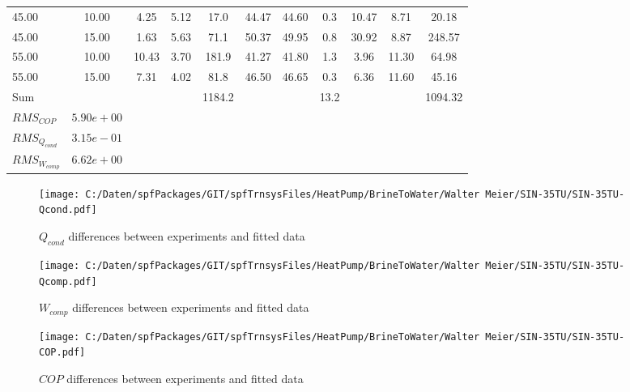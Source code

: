 \documentclass[english]{SPFShortReport}
\begin{document}
\begin{table}[!ht]
\begin{small}
\begin{center}
{\begin{tabular}{l | c c c c c c c c c c }
45.00  & 10.00 & 4.25 & 5.12 & 17.0 & 44.47 & 44.60 & 0.3 & 10.47 & 8.71 & 20.18\\ 
45.00  & 15.00 & 1.63 & 5.63 & 71.1 & 50.37 & 49.95 & 0.8 & 30.92 & 8.87 & 248.57\\ 
55.00  & 10.00 & 10.43 & 3.70 & 181.9 & 41.27 & 41.80 & 1.3 & 3.96 & 11.30 & 64.98\\ 
55.00  & 15.00 & 7.31 & 4.02 & 81.8 & 46.50 & 46.65 & 0.3 & 6.36 & 11.60 & 45.16\\ 
\hline 
 Sum &  & &  & 1184.2 &  &  & 13.2 & &  & 1094.32\\ 
\hline 
 $RMS_{COP}$ & $5.90e+00$ \\ 
 $RMS_{Q_{cond}}$ & $3.15e-01$ \\ 
 $RMS_{W_{comp}}$ & $6.62e+00$ \\ 
\hline
\hline
\end{tabular}
}
\label{ErrorsTable}
\end{center}
\end{small}
\end{table}
\begin{figure}[!ht]
\begin{center}
\texttt{[image: C:/Daten/spfPackages/GIT/spfTrnsysFiles/HeatPump/BrineToWater/Walter Meier/SIN-35TU/SIN-35TU-Qcond.pdf]}
\caption{$Q_{cond}$ differences between experiments and fitted data}
\label{QcongFig}
\end{center}
\end{figure}
\begin{figure}[!ht]
\begin{center}
\texttt{[image: C:/Daten/spfPackages/GIT/spfTrnsysFiles/HeatPump/BrineToWater/Walter Meier/SIN-35TU/SIN-35TU-Qcomp.pdf]}
\caption{$W_{comp}$ differences between experiments and fitted data}
\label{QcompFig}
\end{center}
\end{figure}
\begin{figure}[!ht]
\begin{center}
\texttt{[image: C:/Daten/spfPackages/GIT/spfTrnsysFiles/HeatPump/BrineToWater/Walter Meier/SIN-35TU/SIN-35TU-COP.pdf]}
\caption{$COP$ differences between experiments and fitted data}
\label{COPFig}
\end{center}
\end{figure}
\end{document}
